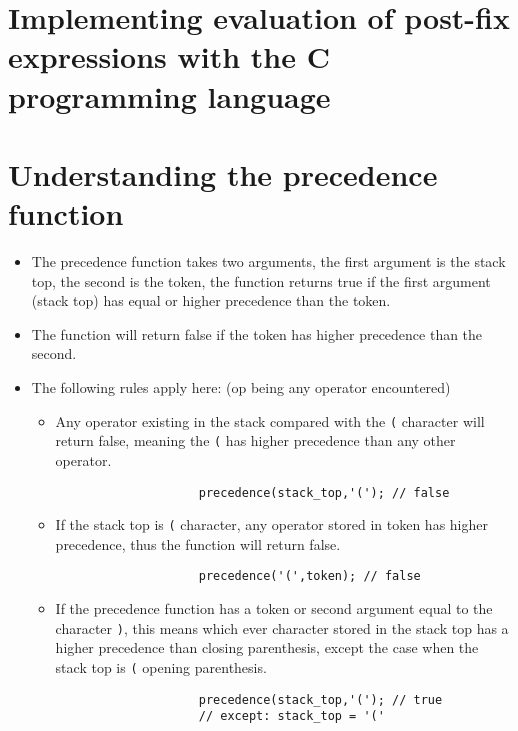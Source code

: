 \section{Implementing evaluation of post-fix expressions with the C programming language}



\section{Understanding the precedence function}
\begin{itemize}
    \item The precedence function takes two arguments, the first argument is the stack top, the second is the token, the function returns true if the first argument (stack top) has equal or higher precedence than the token. 
    \item The function will return false if the token has higher precedence than the second.
    \item The following rules apply here: (op being any operator encountered)
        \begin{itemize}
            \item Any operator existing in the stack compared with the \verb|(| character will return false, meaning the \verb|(| has higher precedence than any other operator.
                \begin{verbatim}
                    precedence(stack_top,'('); // false
                \end{verbatim}
            
            \item If the stack top is \verb|(| character, any operator stored in token has higher precedence, thus the function will return false.
                \begin{verbatim}
                    precedence('(',token); // false
                \end{verbatim}
            
            \item If the precedence function has a token or second argument equal to the character \verb|)|, this means which ever character stored in the stack top has a higher precedence than closing parenthesis, except the case when the stack top is \verb|(| opening parenthesis.
                \begin{verbatim}
                    precedence(stack_top,'('); // true
                    // except: stack_top = '('
                \end{verbatim}
            

\end{itemize}
\end{itemize}

